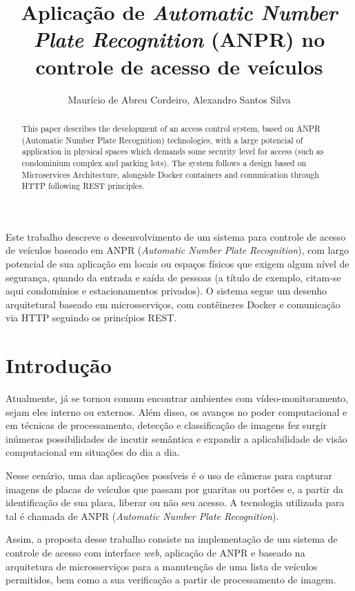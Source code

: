 \documentclass[12pt]{article}
\title{Aplicação de \textit{Automatic Number Plate Recognition} (ANPR) no controle de acesso de veículos}
\author{Maurício de Abreu Cordeiro\inst{1}, Alexandro Santos Silva\inst{1} }
\begin{document}
 

\maketitle

\begin{abstract}
  This paper describes the development of an access control system, based on ANPR (Automatic Number Plate Recognition) technologies, with a large potencial of application in physical spaces which demands some security level for access (such as condominium complex and parking lots). The system follows a design based on Microservices Architecture, alongside Docker containers and comunication through HTTP following REST principles.
\end{abstract}
     
\begin{resumo} 
 Este trabalho descreve o desenvolvimento de um sistema para controle de acesso de veículos baseado em ANPR (\textit{Automatic Number Plate Recognition}), com largo potencial de sua aplicação em locais ou espaços físicos que exigem algum nível de segurança, quando da entrada e saída de pessoas (a título de exemplo, citam-se aqui condomínios e estacionamentos privados). O sistema segue um desenho arquitetural baseado em microsserviços, com contêineres Docker e comunicação via HTTP seguindo os princípios REST.
\end{resumo}

\section{Introdução}

Atualmente, já se tornou comum encontrar ambientes com vídeo-monitoramento, sejam eles interno ou externos. Além disso, os avanços no poder computacional e em técnicas de processamento, detecção e classificação de imagens fez surgir inúmeras possibilidades de incutir semântica e expandir a aplicabilidade de visão computacional em situações do dia a dia.

Nesse cenário, uma das aplicações possíveis é o uso de câmeras para capturar imagens de placas de veículos que passam por guaritas ou portões e, a partir da identificação de sua placa, liberar ou não seu acesso. A tecnologia utilizada para tal é chamada de ANPR (\textit{Automatic Number Plate Recognition}).

Assim, a proposta desse trabalho consiste na implementação de um sistema de controle de acesso com interface \textit{web}, aplicação de ANPR e baseado na arquitetura de microsserviços para a manutenção de uma lista de veículos permitidos, bem como a sua verificação a partir de processamento de imagem.
\end{document}

